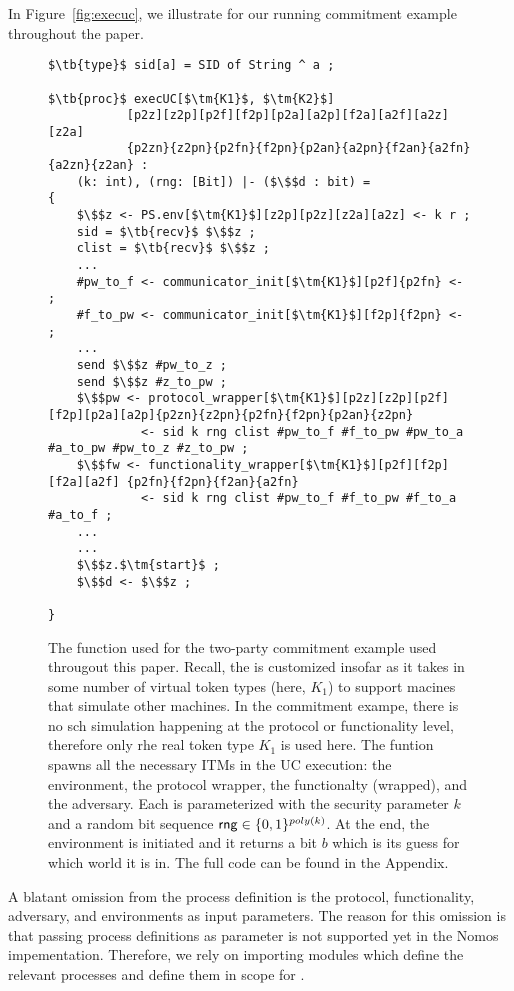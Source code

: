 In Figure~\ref{fig:execuc}, we illustrate  for our running commitment example throughout the paper. 

\begin{figure*}
\begin{lstlisting}[basicstyle=\small\BeraMonottFamily, frame=single,  mathescape]
$\tb{type}$ sid[a] = SID of String ^ a ;

$\tb{proc}$ execUC[$\tm{K1}$, $\tm{K2}$]
           [p2z][z2p][p2f][f2p][p2a][a2p][f2a][a2f][a2z][z2a]
           {p2zn}{z2pn}{p2fn}{f2pn}{p2an}{a2pn}{f2an}{a2fn}{a2zn}{z2an} : 
    (k: int), (rng: [Bit]) |- ($\$$d : bit) = 
{
    $\$$z <- PS.env[$\tm{K1}$][z2p][p2z][z2a][a2z] <- k r ;
    sid = $\tb{recv}$ $\$$z ;
    clist = $\tb{recv}$ $\$$z ;
    ...
    #pw_to_f <- communicator_init[$\tm{K1}$][p2f]{p2fn} <- ;
    #f_to_pw <- communicator_init[$\tm{K1}$][f2p]{f2pn} <- ;
    ...
    send $\$$z #pw_to_z ;
    send $\$$z #z_to_pw ;
    $\$$pw <- protocol_wrapper[$\tm{K1}$][p2z][z2p][p2f][f2p][p2a][a2p]{p2zn}{z2pn}{p2fn}{f2pn}{p2an}{z2pn} 
             <- sid k rng clist #pw_to_f #f_to_pw #pw_to_a #a_to_pw #pw_to_z #z_to_pw ;
    $\$$fw <- functionality_wrapper[$\tm{K1}$][p2f][f2p][f2a][a2f] {p2fn}{f2pn}{f2an}{a2fn}
             <- sid k rng clist #pw_to_f #f_to_pw #f_to_a #a_to_f ;
    ...
    ...
    $\$$z.$\tm{start}$ ;
    $\$$d <- $\$$z ;

}
\end{lstlisting}
\caption{The  function used for the two-party commitment example used througout this paper. Recall, the  is customized insofar as it takes in some number of virtual token types (here, $K_1$) to support macines that simulate other machines. In the commitment exampe, there is no sch simulation happening at the protocol or functionality level, therefore only rhe real token type $K_1$ is used here. The funtion spawns all the necessary ITMs in the UC execution: the environment, the protocol wrapper, the functionalty (wrapped), and the adversary. Each is parameterized with the security parameter $k$ and a random bit sequence ${\mathsf {rng}} \in \{0,1\}^{poly(k)}$.
At the end, the environment is initiated and it returns a bit $b$ which is its guess for which world it is in. The full code can be found in the Appendix.}
\label{lst:execuc}
\end{figure*}

A blatant omission from the  process definition is the protocol, functionality, adversary, and environments as input parameters.
The reason for this omission is that passing process definitions as parameter is not supported yet in the Nomos impementation.
Therefore, we rely on importing modules which define the relevant processes and define them in scope for .


